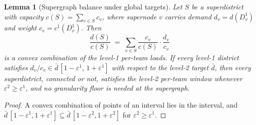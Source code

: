 \documentclass[preprint,12pt,authoryear]{elsarticle}
\newtheorem{lemma}[theorem]{Lemma}
\theoremstyle{definition}
\begin{document}
\begin{lemma}[Supergraph balance under global targets]
\label{thm:super-feasibility}\label{cor:super-feas}\label{lem:super-convex}
Let $S$ be a superdistrict with capacity
$c(S) = \sum_{v \in S} c_v$, where supernode $v$ carries demand
$d_v = d(D^1_v)$ and weight $c_v = c^{1}(D^1_v)$. Then
\[
    \frac{d(S)}{c(S)}
    \;=\; \sum_{v \in S} \frac{c_v}{c(S)} \cdot \frac{d_v}{c_v}
\]
is a convex combination of the level-1 per-team loads. If every
level-1 district satisfies
$d_v / c_v \in \bar{d}\,[1 - \varepsilon^{1},\, 1 + \varepsilon^{1}]$
with respect to the level-2 target $\bar{d}$, then every
superdistrict, connected or not, satisfies the level-2 per-team
window whenever $\varepsilon^{2} \geq \varepsilon^{1}$, and no
granularity floor is needed at the supergraph.
\end{lemma}

\begin{proof}
A convex combination of points of an interval lies in the interval,
and $\bar{d}\,[1-\varepsilon^{1}, 1+\varepsilon^{1}] \subseteq
\bar{d}\,[1-\varepsilon^{2}, 1+\varepsilon^{2}]$ for
$\varepsilon^{2} \geq \varepsilon^{1}$.
\end{proof}
\end{document}
